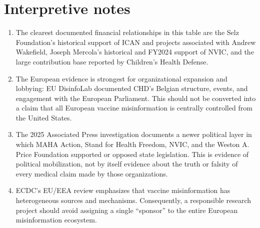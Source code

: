 \documentclass[11pt]{article}
\begin{document}
\section*{Interpretive notes}
\begin{enumerate}[leftmargin=*]
\item The clearest documented financial relationships in this table are the Selz
Foundation's historical support of ICAN and projects associated with Andrew Wakefield,
Joseph Mercola's historical and FY2024 support of NVIC, and the large contribution
base reported by Children's Health Defense.
\item The European evidence is strongest for organizational expansion and lobbying:
EU DisinfoLab documented CHD's Belgian structure, events, and engagement with the
European Parliament.  This should not be converted into a claim that all European
vaccine misinformation is centrally controlled from the United States.
\item The 2025 Associated Press investigation documents a newer political layer in
which MAHA Action, Stand for Health Freedom, NVIC, and the Weston A. Price Foundation
supported or opposed state legislation.  This is evidence of political mobilization,
not by itself evidence about the truth or falsity of every medical claim made by
those organizations.
\item ECDC's EU/EEA review emphasizes that vaccine misinformation has heterogeneous
sources and mechanisms.  Consequently, a responsible research project should avoid
assigning a single ``sponsor'' to the entire European misinformation ecosystem.
\end{enumerate}
\end{document}
